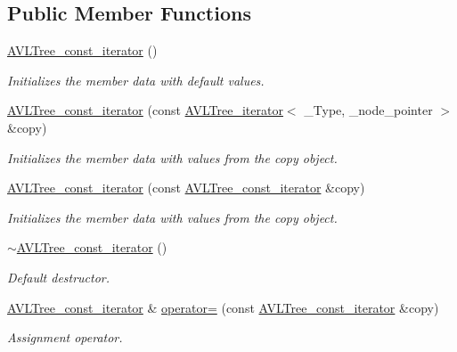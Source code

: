 \subsection*{Public Member Functions}
\begin{DoxyCompactItemize}
\item 
\hyperlink{class_a_v_l_tree__const__iterator_aebe2a178aeadf813a978f9cdb8ff96d3}{A\+V\+L\+Tree\+\_\+const\+\_\+iterator} ()
\begin{DoxyCompactList}\small\item\em Initializes the member data with default values. \end{DoxyCompactList}\item 
\hyperlink{class_a_v_l_tree__const__iterator_aa9555f1f662455ec6af572f9350ade37}{A\+V\+L\+Tree\+\_\+const\+\_\+iterator} (const \hyperlink{class_a_v_l_tree__iterator}{A\+V\+L\+Tree\+\_\+iterator}$<$ \+\_\+\+Type, \+\_\+node\+\_\+pointer $>$ \&copy)
\begin{DoxyCompactList}\small\item\em Initializes the member data with values from the copy object. \end{DoxyCompactList}\item 
\hyperlink{class_a_v_l_tree__const__iterator_a32243cde4217f623dc9522b130874be7}{A\+V\+L\+Tree\+\_\+const\+\_\+iterator} (const \hyperlink{class_a_v_l_tree__const__iterator}{A\+V\+L\+Tree\+\_\+const\+\_\+iterator} \&copy)
\begin{DoxyCompactList}\small\item\em Initializes the member data with values from the copy object. \end{DoxyCompactList}\item 
\hyperlink{class_a_v_l_tree__const__iterator_a592ad3ce6efbfcafe4ecaf41b1f30f85}{$\sim$\+A\+V\+L\+Tree\+\_\+const\+\_\+iterator} ()
\begin{DoxyCompactList}\small\item\em Default destructor. \end{DoxyCompactList}\item 
\hyperlink{class_a_v_l_tree__const__iterator}{A\+V\+L\+Tree\+\_\+const\+\_\+iterator} \& \hyperlink{class_a_v_l_tree__const__iterator_ad4cd511f243d194f804659bd6be65cbf}{operator=} (const \hyperlink{class_a_v_l_tree__const__iterator}{A\+V\+L\+Tree\+\_\+const\+\_\+iterator} \&copy)
\begin{DoxyCompactList}\small\item\em Assignment operator. \end{DoxyCompactList}\item 

\end{DoxyCompactItemize}
